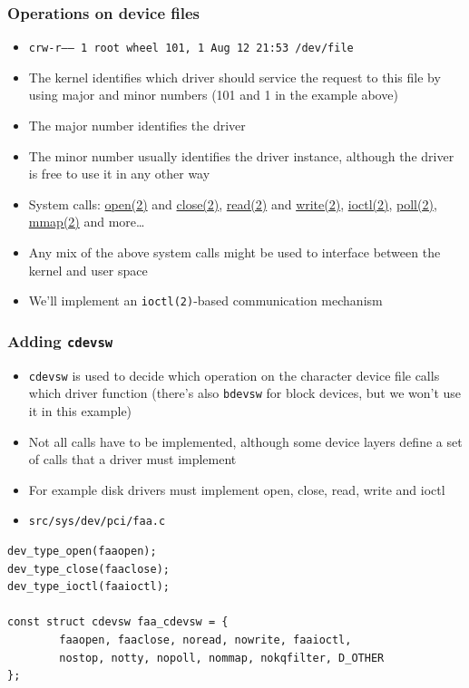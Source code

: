 \documentclass[dvipsnames,table]{beamer}
\begin{document}
\begin{frame}
\frametitle{Operations on device files}
\begin{itemize}
	\scriptsize
	\item {\tt crw-r-----  1 root  wheel  101, 1 Aug 12 21:53 /dev/file}
	\normalsize
	\item The kernel identifies which driver should service the request to this file by using major and minor numbers (101 and 1 in the example above)
	\item The major number identifies the driver
	\item The minor number usually identifies the driver instance, although the driver is free to use it in any other way
	\item System calls: \href{http://netbsd.gw.com/cgi-bin/man-cgi?read++NetBSD-current}{open(2)} and \href{http://netbsd.gw.com/cgi-bin/man-cgi?read++NetBSD-current}{close(2)}, \href{http://netbsd.gw.com/cgi-bin/man-cgi?read++NetBSD-current}{read(2)} and \href{http://netbsd.gw.com/cgi-bin/man-cgi?write++NetBSD-current}{write(2)}, \href{http://netbsd.gw.com/cgi-bin/man-cgi?write++NetBSD-current}{ioctl(2)}, \href{http://netbsd.gw.com/cgi-bin/man-cgi?poll++NetBSD-current}{poll(2)}, \href{http://netbsd.gw.com/cgi-bin/man-cgi?write++NetBSD-current}{mmap(2)} and more\dots
	\item Any mix of the above system calls might be used to interface between the kernel and user space
	\item We'll implement an {\tt ioctl(2)}-based communication mechanism

\end{itemize}
\end{frame}

\begin{frame}[fragile]
\frametitle{Adding {\tt cdevsw}}
\begin{itemize}
	\item {\tt cdevsw} is used to decide which operation on the character device file calls which driver function (there's also {\tt bdevsw} for block devices, but we won't use it in this example)
	\item Not all calls have to be implemented, although some device layers define a set of calls that a driver must implement
	\item For example disk drivers must implement open, close, read, write and ioctl
\end{itemize}
\begin{itemize}
	\item {\tt src/sys/dev/pci/faa.c}
\end{itemize}
\begin{lstlisting}
dev_type_open(faaopen);
dev_type_close(faaclose);
dev_type_ioctl(faaioctl);

const struct cdevsw faa_cdevsw = {
        faaopen, faaclose, noread, nowrite, faaioctl,
        nostop, notty, nopoll, nommap, nokqfilter, D_OTHER
};
\end{lstlisting}
\end{frame}
\end{document}
